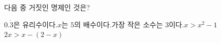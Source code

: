 다음 중 거짓인 명제인 것은?
\begin{choicesv}{$0.\dot{3}$은 유리수이다.}{$x$는 $5$의 배수이다.}{가장 작은 소수는 $3$이다.}{$x>x^2-1$}{$2x>x-(2-x)$}\end{choicesv}
